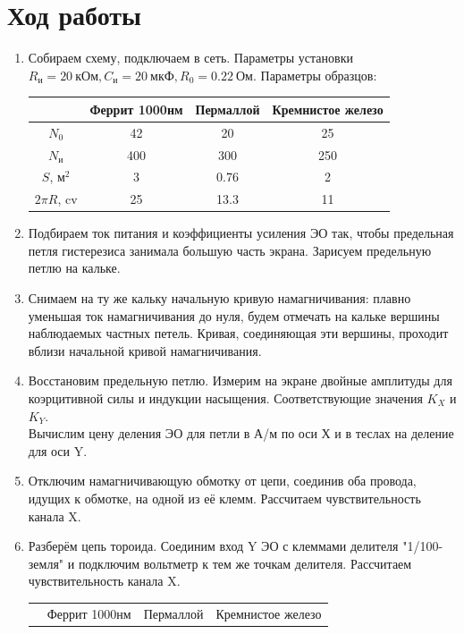 \documentclass[a4paper,12pt]{article}
\begin{document}
\section*{Ход работы}
\begin{enumerate}
\item Собираем схему, подключаем в сеть. Параметры установки $R_\text{и} = 20~\text{кОм}, C_\text{и} = 20~\text{мкФ}, R_0 = 0.22~\text{Ом}$. Параметры образцов:
\begin{table}[h]
\centering
\begin{tabular}{|c|c||c||c|}
\hline
      & Феррит 1000нм & Пермаллой & Кремнистое железо \\ \hline
$N_0$    & 42            & 20        & 25                \\ \hline
$N_\text{и}$    & 400           & 300       & 250               \\ \hline
$S$, м$^2$     & 3        & 0.76  & 2            \\ \hline
$2\pi R$, cv & 25          & 13.3     & 11              \\ \hline
\end{tabular}
\end{table}
\item Подбираем ток питания и коэффициенты усиления ЭО так, чтобы предельная петля гистерезиса занимала большую часть экрана. Зарисуем предельную петлю на кальке.
\item Снимаем на ту же кальку начальную кривую намагничивания: плавно уменьшая ток намагничивания до нуля, будем отмечать на кальке вершины наблюдаемых частных петель. Кривая, соединяющая эти вершины, проходит вблизи начальной кривой намагничивания. 
\item Восстановим предельную петлю. Измерим на экране двойные амплитуды для коэрцитивной силы и индукции насыщения. Соответствующие значения $K_X$ и $K_Y$.\\
Вычислим цену деления ЭО для петли в А/м по оси Х и в теслах на деление для оси Y.
\item Отключим намагничивающую обмотку от цепи, соединив оба провода, идущих к обмотке, на одной из её клемм. Рассчитаем чувствительность канала X.
\item Разберём цепь тороида. Соединим вход Y ЭО с клеммами делителя "1/100-земля" и подключим вольтметр к тем же точкам делителя. Рассчитаем чувствительность канала X.
\begin{table}[t]
\centering
\begin{tabular}{|c|c|c||c|c||c|c|}
\hline
\multirow{2}{*}{} & \multicolumn{2}{c||}{Феррит 1000нм} & \multicolumn{2}{c||}{Пермаллой} & \multicolumn{2}{c|}{Кремнистое железо} \\ \cline{2-7} 

\end{tabular}
\end{table}
\end{enumerate}
\end{document}

